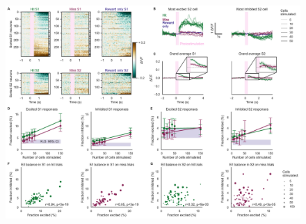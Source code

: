 \begin{figure}[htbp]
\vspace*{-1cm}
\hspace*{-0.2in}
\vspace*{-0.2in}
\includegraphics[scale=0.45]{figures/basic-analysis.pdf}
\caption[\textbf{name}]{
}
\end{figure}
